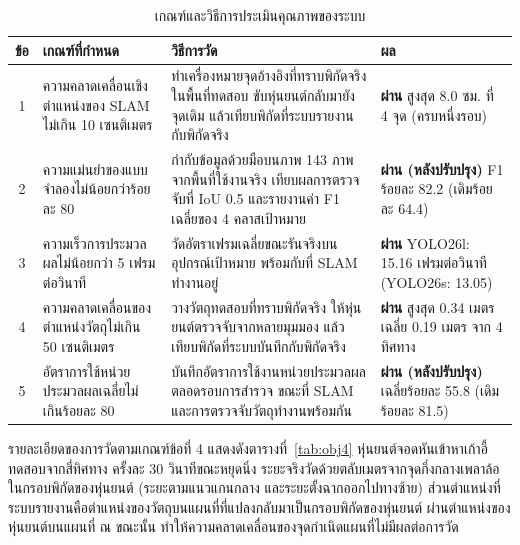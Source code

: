\documentclass[a4paper,12pt]{report}
\begin{document}
\begin{table}[H]
\centering
\caption[เกณฑ์และวิธีการประเมินคุณภาพของระบบ (บทที่ 5)]{เกณฑ์และวิธีการประเมินคุณภาพของระบบ}
\label{tab:eval}
\small
\begin{tabularx}{\textwidth}{|c|X|>{\raggedright\arraybackslash}p{3.3cm}|>{\raggedright\arraybackslash}p{2.7cm}|}
\hline
\textbf{ข้อ} & \textbf{เกณฑ์ที่กำหนด} & \textbf{วิธีการวัด} & \textbf{ผล} \\
\hline
1 & ความคลาดเคลื่อนเชิงตำแหน่งของ SLAM ไม่เกิน 10 เซนติเมตร
  & ทำเครื่องหมายจุดอ้างอิงที่ทราบพิกัดจริงในพื้นที่ทดสอบ
    ขับหุ่นยนต์กลับมายังจุดเดิม แล้วเทียบพิกัดที่ระบบรายงานกับพิกัดจริง
  & \textbf{ผ่าน} \newline สูงสุด 8.0 ซม. ที่ 4 จุด \newline (ครบหนึ่งรอบ) \\
\hline
2 & ความแม่นยำของแบบจำลองไม่น้อยกว่าร้อยละ 80
  & กำกับข้อมูลด้วยมือบนภาพ 143 ภาพจากพื้นที่ใช้งานจริง
    เทียบผลการตรวจจับที่ IoU 0.5 และรายงานค่า F1 เฉลี่ยของ 4 คลาสเป้าหมาย
  & \textbf{ผ่าน (หลังปรับปรุง)} \newline F1 ร้อยละ 82.2 \newline (เดิมร้อยละ 64.4) \\
\hline
3 & ความเร็วการประมวลผลไม่น้อยกว่า 5 เฟรมต่อวินาที
  & วัดอัตราเฟรมเฉลี่ยขณะรันจริงบนอุปกรณ์เป้าหมาย
    พร้อมกับที่ SLAM ทำงานอยู่
  & \textbf{ผ่าน} \newline YOLO26l: 15.16 เฟรมต่อวินาที \newline (YOLO26s: 13.05) \\
\hline
4 & ความคลาดเคลื่อนของตำแหน่งวัตถุไม่เกิน 50 เซนติเมตร
  & วางวัตถุทดสอบที่ทราบพิกัดจริง ให้หุ่นยนต์ตรวจจับจากหลายมุมมอง
    แล้วเทียบพิกัดที่ระบบบันทึกกับพิกัดจริง
  & \textbf{ผ่าน} \newline สูงสุด 0.34 เมตร \newline เฉลี่ย 0.19 เมตร \newline จาก 4 ทิศทาง \\
\hline
5 & อัตราการใช้หน่วยประมวลผลเฉลี่ยไม่เกินร้อยละ 80
  & บันทึกอัตราการใช้งานหน่วยประมวลผลตลอดรอบการสำรวจ
    ขณะที่ SLAM และการตรวจจับวัตถุทำงานพร้อมกัน
  & \textbf{ผ่าน (หลังปรับปรุง)} \newline เฉลี่ยร้อยละ 55.8 \newline (เดิมร้อยละ 81.5) \\
\hline
\end{tabularx}
\end{table}

รายละเอียดของการวัดตามเกณฑ์ข้อที่ 4 แสดงดังตารางที่~\ref{tab:obj4}
หุ่นยนต์จอดหันเข้าหาเก้าอี้ทดสอบจากสี่ทิศทาง ครั้งละ 30 วินาทีขณะหยุดนิ่ง
ระยะจริงวัดด้วยตลับเมตรจากจุดกึ่งกลางเพลาล้อในกรอบพิกัดของหุ่นยนต์
(ระยะตามแนวแกนกลาง และระยะตั้งฉากออกไปทางซ้าย)
ส่วนตำแหน่งที่ระบบรายงานคือตำแหน่งของวัตถุบนแผนที่ที่แปลงกลับมาเป็นกรอบพิกัดของหุ่นยนต์
ผ่านตำแหน่งของหุ่นยนต์บนแผนที่ ณ ขณะนั้น
ทำให้ความคลาดเคลื่อนของจุดกำเนิดแผนที่ไม่มีผลต่อการวัด
\end{document}
